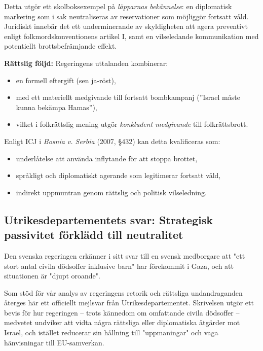 Detta utgör ett skolboksexempel på \textit{läpparnas bekännelse}: en diplomatisk markering som i sak neutraliseras av reservationer som möjliggör fortsatt våld. Juridiskt innebär det ett underminerande av skyldigheten att agera preventivt enligt folkmordskonventionens artikel I, samt en vilseledande kommunikation med potentiellt brottsbefrämjande effekt.

\textbf{Rättslig följd:} Regeringens uttalanden kombinerar:
\begin{itemize}
  \item en formell eftergift (sen ja-röst),
  \item med ett materiellt medgivande till fortsatt bombkampanj (”Israel måste kunna bekämpa Hamas”),
  \item vilket i folkrättslig mening utgör \textit{konkludent medgivande} till folkrättsbrott.
\end{itemize}

Enligt ICJ i \textit{Bosnia v. Serbia} (2007, §432) kan detta kvalificeras som:
\begin{itemize}
  \item underlåtelse att använda inflytande för att stoppa brottet,
  \item språkligt och diplomatiskt agerande som legitimerar fortsatt våld,
  \item indirekt uppmuntran genom rättslig och politisk vilseledning.
\end{itemize}


\subsection*{Utrikesdepartementets svar: Strategisk passivitet förklädd till neutralitet}

Den svenska regeringen erkänner i sitt svar till en svensk medborgare att "ett stort antal civila dödsoffer inklusive barn" har förekommit i Gaza, och att situationen är "djupt oroande".

Som stöd för vår analys av regeringens retorik och rättsliga undandraganden återges här ett officiellt mejlsvar från Utrikesdepartementet. Skrivelsen utgör ett bevis för hur regeringen – trots kännedom om omfattande civila dödsoffer – medvetet undviker att vidta några rättsliga eller diplomatiska åtgärder mot Israel, och istället reducerar sin hållning till "uppmaningar" och vaga hänvisningar till EU-samverkan.

